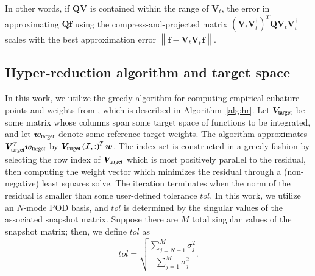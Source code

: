 \documentclass[preprint,10pt]{elsarticle}
\theoremstyle{definition}
\theoremstyle{lemma}
\theoremstyle{theorem}
\theoremstyle{assumption}
\newcommand{\nor}[1]{\left\| #1 \right\|}
\newcommand{\LRp}[1]{\left( #1 \right)}
\begin{document}
 In other words, if $\bm{Q}\bm{V}$ is contained within the range of $\bm{V}_t$, the error in approximating $\bm{Q}\bm{f}$ using the compress-and-projected matrix $\LRp{\bm{V}_t\bm{V}_t^{\dagger}}^T\bm{Q}\bm{V}_t\bm{V}_t^{\dagger}$ scales with the best approximation error $\nor{\bm{f}-\bm{V}_t\bm{V}_t^{\dagger}\bm{f}}$.


\subsection{Hyper-reduction algorithm and target space}
\label{sec:hyperreducalgo}

In this work, we utilize the greedy algorithm for computing empirical cubature points and weights from \cite{an2008optimizing, hernandez2017dimensional}, which is described in Algorithm~\ref{alg:hr}.  Let $\bm{V}_{\rm target}$ be some matrix whose columns span some target space of functions to be integrated, and let $\bm{w}_{\rm target}$ denote some reference target weights.  The algorithm approximates $\bm{V}_{\rm target}^T\bm{w}_{\rm target}$ by $\bm{V}_{\rm target}\LRp{\mathcal{I},:}^T\bm{w}$.  The index set is constructed in a greedy fashion by selecting the row index of $\bm{V}_{\rm target}$ which is most positively parallel to the residual, then computing the weight vector which minimizes the residual through a (non-negative) least squares solve.  The iteration terminates when the norm of the residual is smaller than some user-defined tolerance $tol$.  In this work, we utilize an $N$-mode POD basis, and $tol$ is determined by the singular values of the associated snapshot matrix.  Suppose there are $M$ total singular values of the snapshot matrix; then, we define $tol$ as
\[
tol = \sqrt{\frac{\sum_{j=N+1}^M \sigma_j^2}{\sum_{j=1}^M \sigma_j^2}}.
\]
\end{document}
